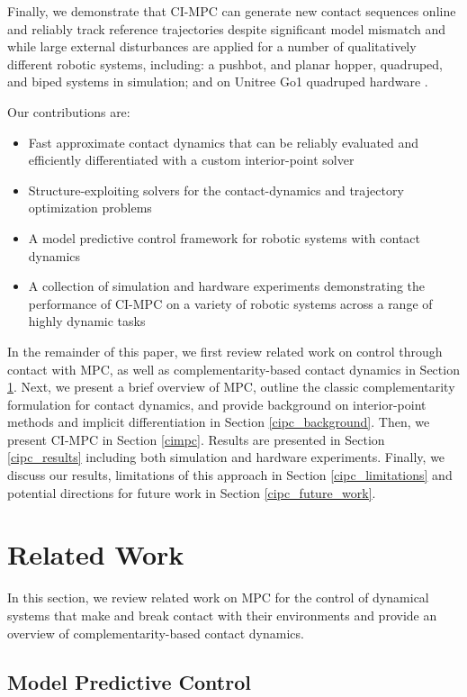Finally, we demonstrate that CI-MPC can generate new contact sequences online and reliably track reference trajectories despite significant model mismatch and while large external disturbances are applied for a number of qualitatively different robotic systems, including: a pushbot, and planar hopper, quadruped, and biped systems in simulation; and on Unitree Go1 quadruped hardware \cite{unitree_go1}.

Our contributions are:
\begin{itemize}
	\item Fast approximate contact dynamics that can be reliably evaluated and efficiently differentiated with a custom interior-point solver
	\item Structure-exploiting solvers for the contact-dynamics and trajectory optimization problems
	\item A model predictive control framework for robotic systems with contact dynamics
	\item A collection of simulation and hardware experiments demonstrating the performance of CI-MPC on a variety of robotic systems across a range of highly dynamic tasks
\end{itemize}

In the remainder of this paper, we first review related work on control through contact with MPC, as well as complementarity-based contact dynamics in Section \ref{cipc_related_work}. Next, we present a brief overview of MPC, outline the classic complementarity formulation for contact dynamics, and provide background on interior-point methods and implicit differentiation in Section \ref{cipc_background}. Then, we present CI-MPC in Section \ref{cimpc}. Results are presented in Section \ref{cipc_results} including both simulation and hardware experiments. Finally, we discuss our results, limitations of this approach in Section \ref{cipc_limitations} and potential directions for future work in Section \ref{cipc_future_work}.

\section{Related Work} \label{cipc_related_work}
In this section, we review related work on MPC for the control of dynamical systems that make and break contact with their environments and provide an overview of complementarity-based contact dynamics.

\subsection{Model Predictive Control}


